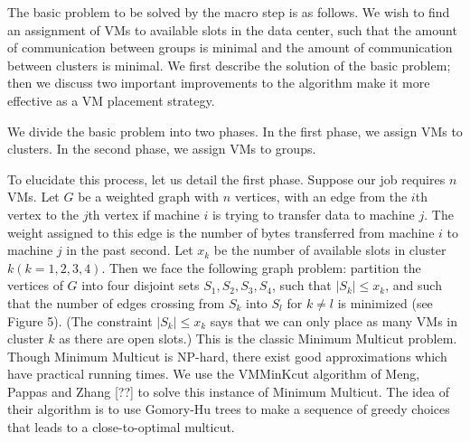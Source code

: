 \documentclass[11pt]{article}
\begin{document}
\normalsize

The basic problem to be solved by the macro step is as follows.  We wish to find an assignment of VMs to available slots in the data center, such that the amount of communication between groups is minimal and the amount of communication between clusters is minimal.  We first describe the solution of the basic problem; then we discuss two important improvements to the algorithm make it more effective as a VM placement strategy.

We divide the basic problem into two phases. In the first phase, we assign VMs to clusters.  In the second phase, we assign VMs to groups.

To elucidate this process, let us detail the first phase.  Suppose our job requires $n$ VMs.  Let $G$ be a weighted graph with $n$ vertices, with an edge from the $i$th vertex to the $j$th vertex if machine $i$ is trying to transfer data to machine $j$.  The weight assigned to this edge is the number of bytes transferred from machine $i$ to machine $j$ in the past second.  Let $x_k$ be the number of available slots in cluster $k (k = 1,2,3,4)$.  Then we face the following graph problem: partition the vertices of $G$ into four disjoint sets $S_1, S_2, S_3, S_4$, such that $|S_k| \leq x_k$, and such that the number of edges crossing from $S_k$ into $S_l$ for $k \neq l$ is minimized (see Figure 5).  (The constraint $|S_k| \leq x_k$ says that we can only place as many VMs in cluster $k$ as there are open slots.)  This is the classic Minimum Multicut problem.  Though Minimum Multicut is NP-hard, there exist good approximations which have practical running times.  We use the VMMinKcut algorithm of Meng, Pappas and Zhang [??] to solve this instance of Minimum Multicut.  The idea of their algorithm is to use Gomory-Hu trees to make a sequence of greedy choices that leads to a close-to-optimal multicut.
\end{document}
